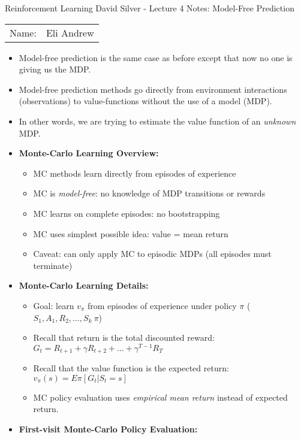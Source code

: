 \documentclass[12pt]{article}
\begin{document}
\begin{center}
{\Large Reinforcement Learning David Silver - Lecture 4 Notes: Model-Free Prediction}

\begin{tabular}{rl}
Name: & Eli Andrew
\end{tabular}
\end{center}

  \begin{itemize}
    \item Model-free prediction is the same case as before except that now no one is giving
    us the MDP. 
    \item Model-free prediction methods go directly from environment interactions (observations)
    to value-functions without the use of a model (MDP).
    \item In other words, we are trying to estimate the value function of an \textit{unknown} MDP.
    \item \textbf{Monte-Carlo Learning Overview:}
    \begin{itemize}
      \item MC methods learn directly from episodes of experience
      \item MC is \textit{model-free}: no knowledge of MDP transitions or rewards
      \item MC learns on complete episodes: no bootstrapping
      \item MC uses simplest possible idea: value = mean return
      \item Caveat: can only apply MC to episodic MDPs (all episodes must terminate)
    \end{itemize}
    \item \textbf{Monte-Carlo Learning Details:}
    \begin{itemize}
      \item Goal: learn $v_\pi$ from episodes of experience under policy $\pi$ ($S_1, A_1, R_2, \dots, S_k ~ \pi$)
      \item Recall that return is the total discounted reward: $G_t = R_{t+1} + \gamma R_{t+2} + \dots + \gamma^{T - 1}R_{T}$
      \item Recall that the value function is the expected return: $v_\pi(s) = E\pi[G_t | S_t = s]$ 
      \item MC policy evaluation uses \textit{empirical mean return} instead of expected return.
    \end{itemize}
    \item \textbf{First-visit Monte-Carlo Policy Evaluation:}

\end{itemize}
\end{document}
